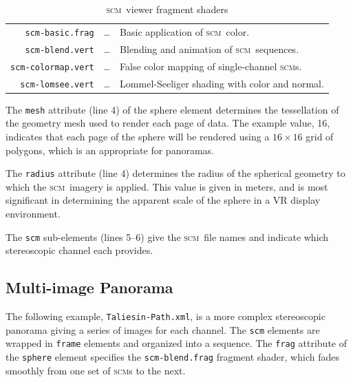 \documentclass[oneside,10pt]{memoir}
\newcommand{\scm}     {\textsc{scm}}
\newcommand{\B}{\bigstrut[b]}
\newcommand{\T}{\bigstrut[t]}
\begin{document}
\begin{Spacing}{1.1}
\begin{table}
  \begin{tabular*}{\textwidth}{rcl}\hline
    \texttt{scm-basic.frag}    & \ldots & Basic application of \scm\ color.\T\\
    \texttt{scm-blend.vert}    & \ldots & Blending and animation of \scm\ sequences.\\
    \texttt{scm-colormap.vert} & \ldots & False color mapping of single-channel \scm s.\\
    \texttt{scm-lomsee.vert}   & \ldots & Lommel-Seeliger shading with color and normal.\B\\\hline
  \end{tabular*}
  \caption{\scm\ viewer fragment shaders}
  \label{tab:frag}
\end{table}

The \texttt{mesh} attribute (line 4) of the sphere element determines the tessellation of the geometry mesh used to render each page of data. The example value, 16, indicates that each page of the sphere will be rendered using a $16\times 16$ grid of polygons, which is an appropriate for panoramas.

The \texttt{radius} attribute (line 4) determines the radius of the spherical geometry to which the \scm\ imagery is applied. This value is given in meters, and is most significant in determining the apparent scale of the sphere in a VR display environment.

The \texttt{scm} sub-elements (lines 5--6) give the \scm\ file names and indicate which stereoscopic channel each provides.

\subsection{Multi-image Panorama}

The following example, \texttt{Taliesin-Path.xml}, is a more complex stereoscopic panorama giving a series of images for each channel. The \texttt{scm} elements are wrapped in \texttt{frame} elements and organized into a sequence. The \texttt{frag} attribute of the \texttt{sphere} element specifies the \texttt{scm-blend.frag} fragment shader, which fades smoothly from one set of \scm s to the next.


\end{Spacing}
\end{document}
